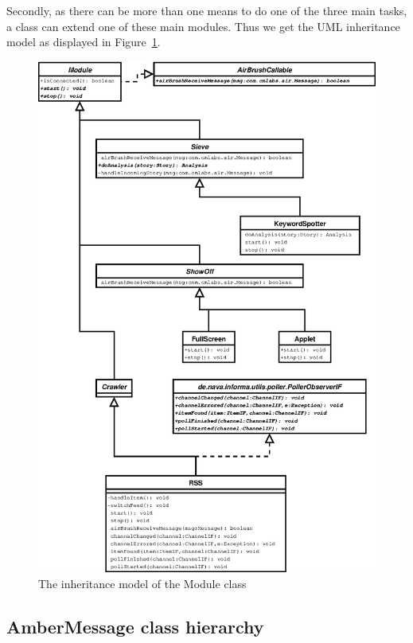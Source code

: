 Secondly, as there can be more than one means to do one of the three main
tasks, a class can extend one of these main modules. Thus we get the UML
inheritance model as displayed in Figure~\ref{fig:class-diagram-module}.

\begin{figure}[htp]
  \centering
  \includegraphics{image/class-diagram-module}
  \caption{
    \label{fig:class-diagram-module}
    The inheritance model of the Module class}
\end{figure}

\subsection{AmberMessage class hierarchy}

